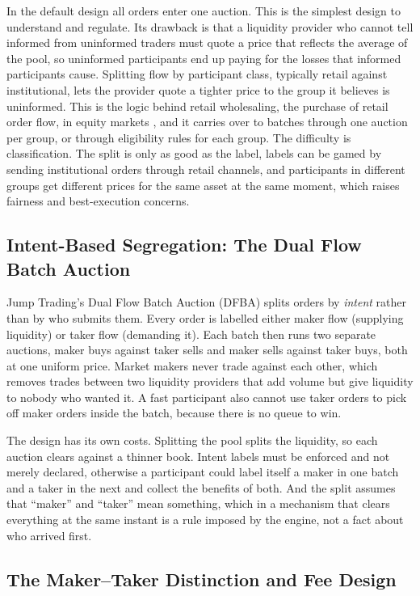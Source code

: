 In the default design all orders enter one auction. This is the simplest
design to understand and regulate. Its drawback is that a liquidity provider
who cannot tell informed from uninformed traders must quote a price that
reflects the average of the pool, so uninformed participants end up paying for
the losses that informed participants cause. Splitting flow by participant
class, typically retail against institutional, lets the provider quote a
tighter price to the group it believes is uninformed. This is the logic
behind retail wholesaling, the purchase of retail order flow, in equity
markets \citep{easley1996cream}, and it carries over to batches
through one auction per group, or through eligibility rules for each group.
The difficulty is classification. The split is only as good as the label,
labels can be gamed by sending institutional orders through retail channels,
and participants in different groups get different prices for the same asset
at the same moment, which raises fairness and best-execution concerns.

\subsection{Intent-Based Segregation: The Dual Flow Batch Auction}

Jump Trading's Dual Flow Batch Auction (DFBA) \citep{jump2025dfba} splits
orders by \emph{intent} rather than by who submits them. Every order is
labelled either maker flow (supplying liquidity) or taker flow (demanding
it). Each batch then runs two separate auctions, maker buys against taker
sells and maker sells against taker buys, both at one uniform price. Market
makers never trade against each other, which removes trades between two
liquidity providers that add volume but give liquidity to nobody who wanted
it. A fast participant also cannot use taker orders to pick off maker orders
inside the batch, because there is no queue to win.

The design has its own costs. Splitting the pool splits the liquidity, so each
auction clears against a thinner book. Intent labels must be enforced and not
merely declared, otherwise a participant could label itself a maker in one
batch and a taker in the next and collect the benefits of both. And the split
assumes that ``maker'' and ``taker'' mean something, which in a mechanism that
clears everything at the same instant is a rule imposed by the engine, not a
fact about who arrived first.

\subsection{The Maker--Taker Distinction and Fee Design}

